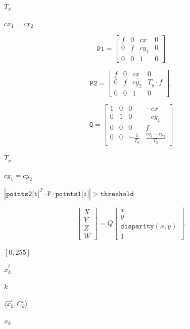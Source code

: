 \documentclass{article}
\begin{document}
$T_x$
\pagebreak

$cx_1=cx_2$
\pagebreak

\[\texttt{P1} = \begin{bmatrix}
                        f & 0 & cx & 0 \\
                        0 & f & cy_1 & 0 \\
                        0 & 0 & 1 & 0
                     \end{bmatrix}\]
\pagebreak

\[\texttt{P2} = \begin{bmatrix}
                        f & 0 & cx & 0 \\
                        0 & f & cy_2 & T_y \cdot f \\
                        0 & 0 & 1 & 0
                     \end{bmatrix},\]
\pagebreak

\[\texttt{Q} = \begin{bmatrix}
                        1 & 0 & 0 & -cx \\
                        0 & 1 & 0 & -cy_1 \\
                        0 & 0 & 0 & f \\
                        0 & 0 & -\frac{1}{T_y} & \frac{cy_1 - cy_2}{T_y}
                    \end{bmatrix} \]
\pagebreak

$T_y$
\pagebreak

$cy_1=cy_2$
\pagebreak

$|\texttt{points2[i]}^T \cdot \texttt{F} \cdot \texttt{points1[i]}|>\texttt{threshold}$
\pagebreak

\[\begin{bmatrix}
X \\
Y \\
Z \\
W
\end{bmatrix} = Q \begin{bmatrix}
x \\
y \\
\texttt{disparity} (x,y) \\
1
\end{bmatrix}.\]
\pagebreak

$[0,255]$
\pagebreak

$\hat{x}^{i}_{k}$
\pagebreak

$k$
\pagebreak

$\langle \hat{x}^{i}_{k}, C^{i}_{k} \rangle$
\pagebreak

$x_{k}$
\pagebreak
\end{document}
